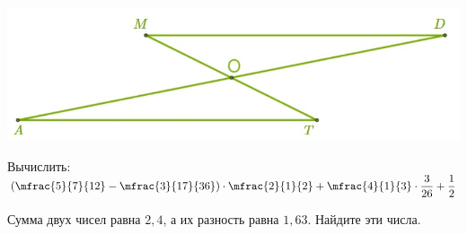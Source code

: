 \begin{class}[number=5]
\begin{listofex}[resume]
		\hspace{0.05\linewidth}
		\begin{minipage}[t]{0.5\linewidth}
			\includegraphics[align=t, width=\textwidth]{pics/G71M4C5-2.jpg}
		\end{minipage}
		\item Вычислить: \( \left( \mfrac{5}{7}{12}-\mfrac{3}{17}{36} \right)\cdot\mfrac{2}{1}{2}+\mfrac{4}{1}{3}\cdot\dfrac{3}{26}+\dfrac{1}{2} \)
		\item Сумма двух чисел равна \(2,4\), а их разность равна \(1,63\). Найдите эти числа.
	\end{listofex}
\end{class}
%
%
%
%	
%
%
